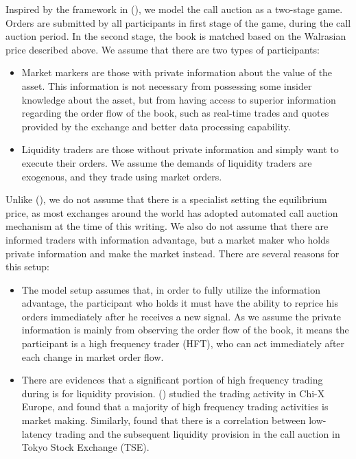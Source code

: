 Inspired by the framework in (\cite{Madhavan2015}), we model the call auction as a two-stage game. Orders are submitted by all participants in first stage of the game, during the call auction period. In the second stage, the book is matched based on the Walrasian price described above. We assume that there are two types of participants:

\begin{itemize}
  \item Market markers are those with private information about the value of the asset. This information is not necessary from possessing some insider knowledge about the asset, but from having access to superior information regarding the order flow of the book, such as real-time trades and quotes provided by the exchange and better data processing capability.
  \item Liquidity traders are those without private information and simply want to execute their orders. We assume the demands of liquidity traders are exogenous, and they trade using market orders.
\end{itemize}

Unlike (\cite{Madhavan2015}), we do not assume that there is a specialist setting the equilibrium price, as most exchanges around the world has adopted automated call auction mechanism at the time of this writing. We also do not assume that there are informed traders with information advantage, but a market maker who holds private information and make the market instead. There are several reasons for this setup:
\begin{itemize}
  \item The model setup assumes that, in order to fully utilize the information advantage, the participant who holds it must have the ability to reprice his orders immediately after he receives a new signal. As we assume the private information is mainly from observing the order flow of the book, it means the participant is a high frequency trader (HFT), who can act immediately after each change in market order flow.
  \item There are evidences that a significant portion of high frequency trading during is for liquidity provision. (\cite{Menkveld2013}) studied the trading activity in Chi-X Europe, and found that a majority of high frequency trading activities is market making. Similarly, \cite{Bellia2017} found that there is a correlation between low-latency trading and the subsequent liquidity provision in the call auction in Tokyo Stock Exchange (TSE).
\end{itemize}


